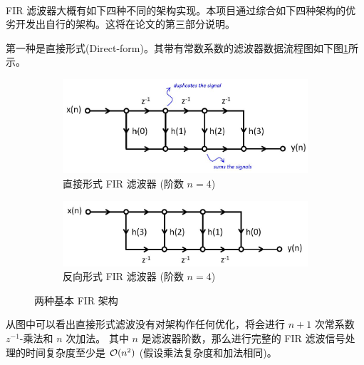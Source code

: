 \paragraph{}
FIR 滤波器大概有如下四种不同的架构实现。本项目通过综合如下四种架构的优劣开发出自行的架构。这将在论文的第三部分说明。

第一种是直接形式(Direct-form)。其带有常数系数的滤波器数据流程图如下图\ref{fig:Direct-form-FIR}所示。
\begin{center}
    \begin{figure}[ht!]
        \begin{subfigure}{\textwidth}
            \centering
            \includegraphics[scale=0.3]{figures/FIR_Direct.jpg}
            \caption{直接形式 FIR 滤波器 (阶数 $n=4$)}
            \label{fig:Direct-form-FIR}
        \end{subfigure}
        \hfill
        \begin{subfigure}{\textwidth}
            \centering
            \includegraphics[scale=0.3]{figures/FIR_Transpose.jpg}
            \caption{反向形式 FIR 滤波器 (阶数 $n=4$)}
            \label{fig:Transpose-form-FIR}
        \end{subfigure}
        \caption{两种基本 FIR 架构}
        \label{fig:Direct-Transpose-FIR}
    \end{figure}
\end{center}

从图中可以看出直接形式滤波没有对架构作任何优化，将会进行 $n+1$ 次常系数 $z^{-1}$-乘法和 $n$ 次加法。
其中 $n$ 是滤波器阶数，那么进行完整的 FIR 滤波信号处理的时间复杂度至少是 $\mathcal{O} (n^2)$ (假设乘法复杂度和加法相同)。


